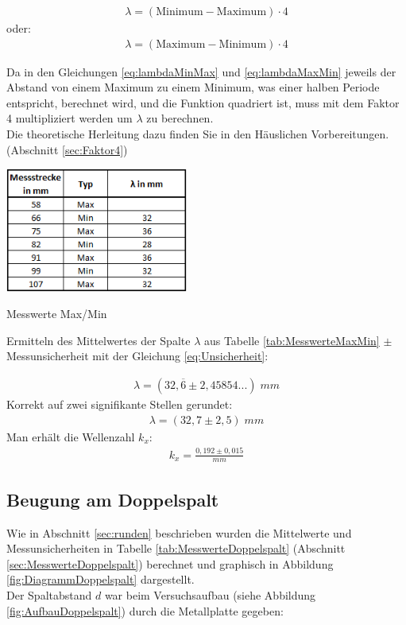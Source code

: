 \documentclass[a4paper]{scrartcl}
\numberwithin{equation}{subsection}
\begin{document}
\begin{align}
\lambda = (\text{Minimum} - \text{Maximum}) \cdot 4
\label{eq:lambdaMinMax}
\end{align}
oder:
\begin{align}
\lambda = (\text{Maximum} - \text{Minimum}) \cdot 4
\label{eq:lambdaMaxMin}
\end{align}

Da in den Gleichungen \ref{eq:lambdaMinMax} und \ref{eq:lambdaMaxMin} jeweils der Abstand von einem Maximum zu einem Minimum, was einer halben Periode entspricht, berechnet wird, und die Funktion quadriert ist, muss mit dem Faktor 4 multipliziert werden um $\lambda$ zu berechnen.\\
Die theoretische Herleitung dazu finden Sie in den Häuslichen Vorbereitungen. (Abschnitt \ref{sec:Faktor4})\\

\begin{table}[H]
\includegraphics[width=6cm]{Tabelle_Max_Min}
\centering
\caption{Messwerte Max/Min}
\centering
\label{tab:MesswerteMaxMin}
\end{table}

Ermitteln des Mittelwertes der Spalte $\lambda$ aus Tabelle \ref{tab:MesswerteMaxMin} $\pm$ Messunsicherheit mit der Gleichung \ref{eq:Unsicherheit}:

\begin{align*}
\lambda = (32,\overline{6}\pm 2,45854...)\; mm
\end{align*}
Korrekt auf zwei signifikante Stellen gerundet:
\begin{align*}
\lambda = (32,7\pm 2,5)\; mm
\end{align*}
Man erhält die Wellenzahl $k_x$:
\begin{align*}
k_x = \frac{0,192\pm 0,015}{mm}
\end{align*}

\subsection{Beugung am Doppelspalt}
Wie in Abschnitt \ref{sec:runden} beschrieben wurden die Mittelwerte und Messunsicherheiten in Tabelle \ref{tab:MesswerteDoppelspalt} (Abschnitt \ref{sec:MesswerteDoppelspalt}) berechnet und graphisch in Abbildung \ref{fig:DiagrammDoppelspalt} dargestellt.\\
Der Spaltabstand $d$ war beim Versuchsaufbau (siehe Abbildung \ref{fig:AufbauDoppelspalt}) durch die Metallplatte gegeben:
\end{document}
